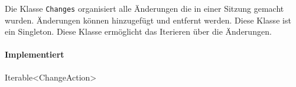 Die Klasse \verb#Changes# organisiert alle Änderungen die in einer Sitzung gemacht wurden.
Änderungen können hinzugefügt und entfernt werden.
Diese Klasse ist ein Singleton. Diese Klasse ermöglicht das Iterieren über die Änderungen.

\paragraph*{Implementiert}
Iterable<ChangeAction>